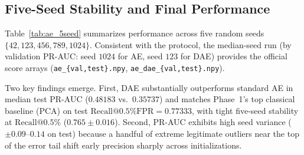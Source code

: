 \subsection{Five-Seed Stability and Final Performance}
\label{sec:ae_5seed}

Table~\ref{tab:ae_5seed} summarizes performance across five random seeds
$\{42, 123, 456, 789, 1024\}$.  Consistent with the protocol, the median-seed
run (by validation PR-AUC: seed $1024$ for AE, seed $123$ for DAE) provides
the official score arrays (\texttt{ae\_\{val,test\}.npy},
\texttt{ae\_dae\_\{val,test\}.npy}).

\begin{table}[t]
\caption{Five-Seed Stability and Median-Seed Official Evaluation (Base Features, $d=31$)}
\label{tab:ae_5seed}
\centering
\footnotesize
{}
\end{table}

Two key findings emerge.  First, DAE substantially outperforms standard AE in
median test PR-AUC ($0.48183$ vs.\ $0.35737$) and matches Phase~1's top
classical baseline (PCA) on test $\text{Recall@0.5\% FPR} = 0.77333$, with
tight five-seed stability at $\text{Recall@0.5\%}$ ($0.765 \pm 0.016$).
Second, PR-AUC exhibits high seed variance ($\pm 0.09$--$0.14$ on test) because
a handful of extreme legitimate outliers near the top of the error tail shift
early precision sharply across initializations.

